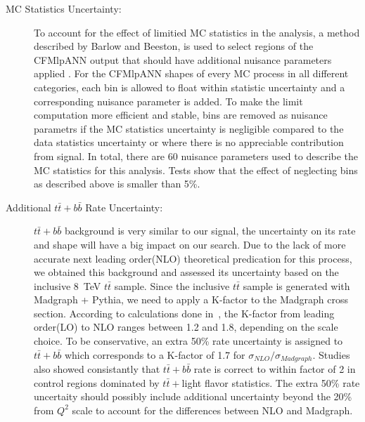 \begin{description}
  \item[MC Statistics Uncertainty:]  To account for the effect of
    limitied MC statistics in the analysis, a method described by
    Barlow and Beeston, is used to select regions of the CFMlpANN
    output that should have additional nuisance parameters applied
    \cite{BarlowBeeston,BarlowBeeston2}. For the CFMlpANN shapes of
    every MC process in all different categories, each bin is allowed
    to float within statistic uncertainty and a corresponding nuisance
    parameter is added. To make the limit computation more efficient
    and stable, bins are removed as nuisance parametrs if the MC
    statistics uncertainty is negligible compared to the data
    statistics  uncertainty or where there is no appreciable
    contribution from signal. In total, there are 60 nuisance
    parameters used to describe the MC statistics for this analysis.
    Tests show that the effect of neglecting bins as 
    described above is smaller than 5\%. 

  \item[Additional $t\bar{t}+b\bar{b}$ Rate Uncertainty:]
    $t\bar{t}+b\bar{b}$ background is very similar to our signal, the
    uncertainty on its rate and shape will have a big impact on our
    search. Due to the lack of more accurate next leading order(NLO)
    theoretical predication for this process, we obtained this
    background and assessed its uncertainty based on the inclusive
    8~TeV $t\bar{t}$ sample. Since the inclusive $t\bar{t}$ sample is
    generated with Madgraph + Pythia, we need to apply a K-factor to
    the Madgraph cross section. According to calculations done
    in~\cite{kfactor}, the K-factor from leading order(LO) to NLO
    ranges between 1.2 and 1.8, depending on the scale choice.  To be
    conservative, an extra 50\% rate uncertainty is assigned to
    $t\bar{t}+b\bar{b}$ which corresponds to a K-factor of 1.7 for
    $\sigma_{NLO}/\sigma_{Madgraph}$. Studies also showed consistantly
    that $t\bar{t}+b\bar{b}$ rate is correct to within factor of 2 in
    control regions dominated by $t\bar{t}+$light flavor statistics.
    The extra 50\% rate uncertaity should possibly include additional
    uncertainty beyond the 20\% from $Q^{2}$ scale to account for the
    differences between NLO and Madgraph. 


\end{description}
